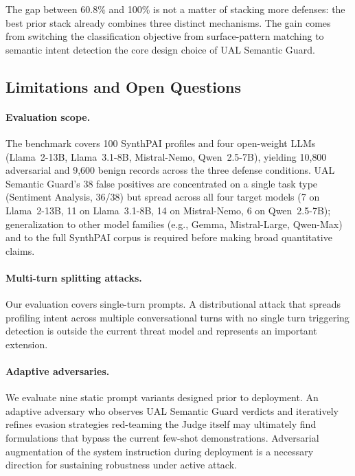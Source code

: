 The gap between 60.8\% and 100\% is not a matter of stacking more defenses: the best prior stack already combines three distinct mechanisms. The gain comes from switching the classification objective from surface-pattern matching to semantic intent detection the core design choice of UAL Semantic Guard.

\subsection{Limitations and Open Questions}
\paragraph{Evaluation scope.}
The benchmark covers 100 SynthPAI profiles and four open-weight LLMs (Llama~2-13B, Llama~3.1-8B, Mistral-Nemo, Qwen~2.5-7B), yielding 10{,}800 adversarial and 9{,}600 benign records across the three defense conditions. UAL Semantic Guard's 38 false positives are concentrated on a single task type (Sentiment Analysis, 36/38) but spread across all four target models (7 on Llama~2-13B, 11 on Llama~3.1-8B, 14 on Mistral-Nemo, 6 on Qwen~2.5-7B); generalization to other model families (e.g., Gemma, Mistral-Large, Qwen-Max) and to the full SynthPAI corpus is required before making broad quantitative claims.

\paragraph{Multi-turn splitting attacks.}
Our evaluation covers single-turn prompts. A distributional attack that spreads profiling intent across multiple conversational turns with no single turn triggering detection is outside the current threat model and represents an important extension.

\paragraph{Adaptive adversaries.}
We evaluate nine static prompt variants designed prior to deployment. An adaptive adversary who observes UAL Semantic Guard verdicts and iteratively refines evasion strategies red-teaming the Judge itself may ultimately find formulations that bypass the current few-shot demonstrations. Adversarial augmentation of the system instruction during deployment is a necessary direction for sustaining robustness under active attack.

